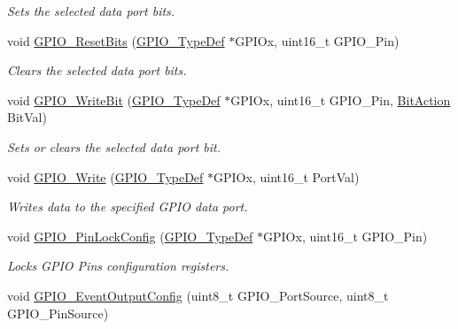 \begin{DoxyCompactItemize}
\begin{DoxyCompactList}\small\item\em Sets the selected data port bits. \end{DoxyCompactList}\item 
void \mbox{\hyperlink{group___g_p_i_o___private___functions_ga6fcd35b207a66608dd2c9d7de9247dc8}{G\+P\+I\+O\+\_\+\+Reset\+Bits}} (\mbox{\hyperlink{struct_g_p_i_o___type_def}{G\+P\+I\+O\+\_\+\+Type\+Def}} $\ast$G\+P\+I\+Ox, uint16\+\_\+t G\+P\+I\+O\+\_\+\+Pin)
\begin{DoxyCompactList}\small\item\em Clears the selected data port bits. \end{DoxyCompactList}\item 
void \mbox{\hyperlink{group___g_p_i_o___private___functions_ga8f7b237fd744d9f7456fbe0da47a9b80}{G\+P\+I\+O\+\_\+\+Write\+Bit}} (\mbox{\hyperlink{struct_g_p_i_o___type_def}{G\+P\+I\+O\+\_\+\+Type\+Def}} $\ast$G\+P\+I\+Ox, uint16\+\_\+t G\+P\+I\+O\+\_\+\+Pin, \mbox{\hyperlink{group___g_p_i_o___exported___types_ga176130b21c0e719121470a6042d4cf19}{Bit\+Action}} Bit\+Val)
\begin{DoxyCompactList}\small\item\em Sets or clears the selected data port bit. \end{DoxyCompactList}\item 
void \mbox{\hyperlink{group___g_p_i_o___private___functions_gaa925f19c8547a00c7a0c269a84873bf9}{G\+P\+I\+O\+\_\+\+Write}} (\mbox{\hyperlink{struct_g_p_i_o___type_def}{G\+P\+I\+O\+\_\+\+Type\+Def}} $\ast$G\+P\+I\+Ox, uint16\+\_\+t Port\+Val)
\begin{DoxyCompactList}\small\item\em Writes data to the specified G\+P\+IO data port. \end{DoxyCompactList}\item 
void \mbox{\hyperlink{group___g_p_i_o___private___functions_gad2f2e615928c69fd0d8c641a7cedaafc}{G\+P\+I\+O\+\_\+\+Pin\+Lock\+Config}} (\mbox{\hyperlink{struct_g_p_i_o___type_def}{G\+P\+I\+O\+\_\+\+Type\+Def}} $\ast$G\+P\+I\+Ox, uint16\+\_\+t G\+P\+I\+O\+\_\+\+Pin)
\begin{DoxyCompactList}\small\item\em Locks G\+P\+IO Pins configuration registers. \end{DoxyCompactList}\item 
void \mbox{\hyperlink{group___g_p_i_o___private___functions_ga935f31ed7a86c6cb594cf34313b4b7af}{G\+P\+I\+O\+\_\+\+Event\+Output\+Config}} (uint8\+\_\+t G\+P\+I\+O\+\_\+\+Port\+Source, uint8\+\_\+t G\+P\+I\+O\+\_\+\+Pin\+Source)

\end{DoxyCompactItemize}
